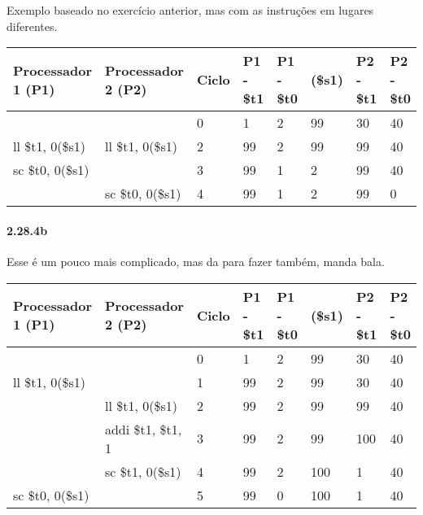 \documentclass{article}
\begin{document}
Exemplo baseado no exercício anterior, mas com as instruções em lugares 
diferentes.

\begin{table}[ht!]
\centering
\begin{tabular}{|l|l|l|l|l|l|l|l|}
\hline Processador 1 (P1) &
       Processador 2 (P2) &
       Ciclo              &
       P1 - \$t1          &
       P1 - \$t0          &
       (\$s1)             &
       P2 - \$t1          &
       P2 - \$t0          \\

\hline                  &                  & 0 & 1  & 2 & 99 & 30 & 40 \\ 
\hline ll \$t1, 0(\$s1) & ll \$t1, 0(\$s1) & 2 & 99 & 2 & 99 & 99 & 40 \\ 
\hline sc \$t0, 0(\$s1) &                  & 3 & 99 & 1 & 2  & 99 & 40 \\ 
\hline                  & sc \$t0, 0(\$s1) & 4 & 99 & 1 & 2  & 99 & 0  \\ 
\hline 
\end{tabular} 
\end{table}

\paragraph{2.28.4b} Esse é um pouco mais complicado, mas da para fazer também, 
manda bala.

\begin{table}[ht!]
\centering
\begin{tabular}{|l|l|l|l|l|l|l|l|}

\hline Processador 1 (P1) &
       Processador 2 (P2) &
       Ciclo              &
       P1 - \$t1          &
       P1 - \$t0          &
       (\$s1)             &
       P2 - \$t1          &
       P2 - \$t0          \\

\hline                   &                    & 0 & 1   & 2 & 99  & 30  & 40 \\
\hline  ll \$t1, 0(\$s1) &                    & 1 & 99  & 2 & 99  & 30  & 40 \\
\hline                   & ll \$t1, 0(\$s1)   & 2 & 99  & 2 & 99  & 99  & 40 \\
\hline                   & addi \$t1, \$t1, 1 & 3 & 99  & 2 & 99  & 100 & 40 \\
\hline                   & sc \$t1, 0(\$s1)   & 4 & 99  & 2 & 100 & 1   & 40 \\
\hline sc \$t0, 0(\$s1)  &                    & 5 & 99  & 0 & 100 & 1   & 40 \\
\hline
\end{tabular} 
\end{table}
\end{document}
